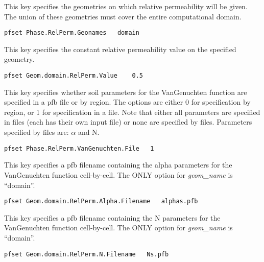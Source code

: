 {This key specifies the geometries on which relative permeability will be
given.  The union of these geometries must cover the entire computational
domain.}
\begin{display}\begin{verbatim}
pfset Phase.RelPerm.Geonames   domain
\end{verbatim}\end{display}

{This key specifies the constant relative permeability value on the specified
geometry. }
\begin{display}\begin{verbatim}
pfset Geom.domain.RelPerm.Value    0.5
\end{verbatim}\end{display}

{This key specifies whether soil parameters for the VanGenuchten function are
specified in a pfb file or by region.  The options are either 0 for
specification by region, or 1 for specification in a file.  Note that either
all parameters are specified in files (each has their own input file) or none
are specified by files.  Parameters specified by files are: $\alpha$ and N.}
\begin{display}\begin{verbatim}
pfset Phase.RelPerm.VanGenuchten.File   1
\end{verbatim}\end{display}

{This key specifies a pfb filename containing the alpha parameters for the
VanGenuchten function cell-by-cell.  The ONLY option for {\em geom\_name} is
``domain''.}
\begin{display}\begin{verbatim}
pfset Geom.domain.RelPerm.Alpha.Filename   alphas.pfb
\end{verbatim}\end{display}

{This key specifies a pfb filename containing the N parameters for the
VanGenuchten function cell-by-cell.  The ONLY option for {\em geom\_name} is
``domain''.}
\begin{display}\begin{verbatim}
pfset Geom.domain.RelPerm.N.Filename   Ns.pfb
\end{verbatim}\end{display}

